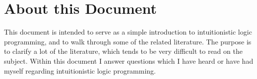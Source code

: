 \section{About this Document}

This document is intended to serve as a simple introduction to intuitionistic logic programming, and to walk through some of the related literature.
The purpose is to clarify a lot of the literature, which tends to be very difficult to read on the subject.
Within this document I answer questions which I have heard or have had myself regarding intuitionistic logic programming.

